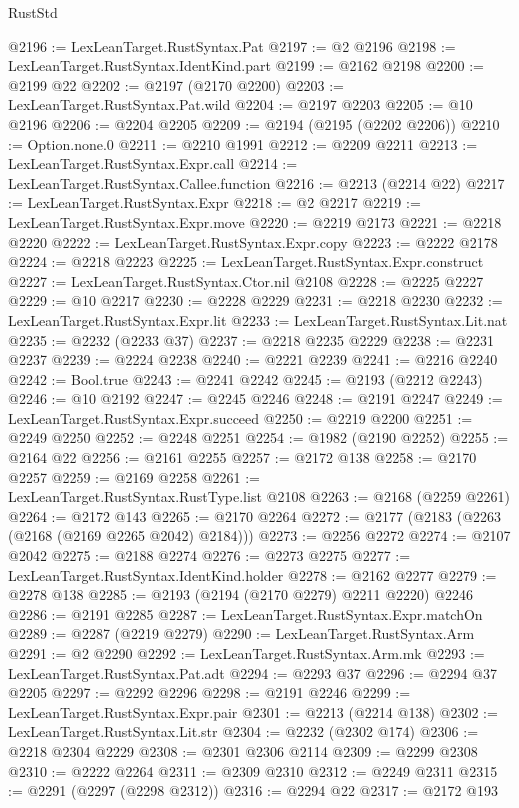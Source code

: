 \begin{lexlean}{RustStd}
\begin{coremodule}
@2196 := LexLeanTarget.RustSyntax.Pat
@2197 := @2 @2196
@2198 := LexLeanTarget.RustSyntax.IdentKind.part
@2199 := @2162 @2198
@2200 := @2199 @22
@2202 := @2197 (@2170 @2200)
@2203 := LexLeanTarget.RustSyntax.Pat.wild
@2204 := @2197 @2203
@2205 := @10 @2196
@2206 := @2204 @2205
@2209 := @2194 (@2195 (@2202 @2206))
@2210 := Option.none.{0}
@2211 := @2210 @1991
@2212 := @2209 @2211
@2213 := LexLeanTarget.RustSyntax.Expr.call
@2214 := LexLeanTarget.RustSyntax.Callee.function
@2216 := @2213 (@2214 @22)
@2217 := LexLeanTarget.RustSyntax.Expr
@2218 := @2 @2217
@2219 := LexLeanTarget.RustSyntax.Expr.move
@2220 := @2219 @2173
@2221 := @2218 @2220
@2222 := LexLeanTarget.RustSyntax.Expr.copy
@2223 := @2222 @2178
@2224 := @2218 @2223
@2225 := LexLeanTarget.RustSyntax.Expr.construct
@2227 := LexLeanTarget.RustSyntax.Ctor.nil @2108
@2228 := @2225 @2227
@2229 := @10 @2217
@2230 := @2228 @2229
@2231 := @2218 @2230
@2232 := LexLeanTarget.RustSyntax.Expr.lit
@2233 := LexLeanTarget.RustSyntax.Lit.nat
@2235 := @2232 (@2233 @37)
@2237 := @2218 @2235 @2229
@2238 := @2231 @2237
@2239 := @2224 @2238
@2240 := @2221 @2239
@2241 := @2216 @2240
@2242 := Bool.true
@2243 := @2241 @2242
@2245 := @2193 (@2212 @2243)
@2246 := @10 @2192
@2247 := @2245 @2246
@2248 := @2191 @2247
@2249 := LexLeanTarget.RustSyntax.Expr.succeed
@2250 := @2219 @2200
@2251 := @2249 @2250
@2252 := @2248 @2251
@2254 := @1982 (@2190 @2252)
@2255 := @2164 @22
@2256 := @2161 @2255
@2257 := @2172 @138
@2258 := @2170 @2257
@2259 := @2169 @2258
@2261 := LexLeanTarget.RustSyntax.RustType.list @2108
@2263 := @2168 (@2259 @2261)
@2264 := @2172 @143
@2265 := @2170 @2264
@2272 := @2177 (@2183 (@2263 (@2168 (@2169 @2265 @2042) @2184)))
@2273 := @2256 @2272
@2274 := @2107 @2042
@2275 := @2188 @2274
@2276 := @2273 @2275
@2277 := LexLeanTarget.RustSyntax.IdentKind.holder
@2278 := @2162 @2277
@2279 := @2278 @138
@2285 := @2193 (@2194 (@2170 @2279) @2211 @2220) @2246
@2286 := @2191 @2285
@2287 := LexLeanTarget.RustSyntax.Expr.matchOn
@2289 := @2287 (@2219 @2279)
@2290 := LexLeanTarget.RustSyntax.Arm
@2291 := @2 @2290
@2292 := LexLeanTarget.RustSyntax.Arm.mk
@2293 := LexLeanTarget.RustSyntax.Pat.adt
@2294 := @2293 @37
@2296 := @2294 @37 @2205
@2297 := @2292 @2296
@2298 := @2191 @2246
@2299 := LexLeanTarget.RustSyntax.Expr.pair
@2301 := @2213 (@2214 @138)
@2302 := LexLeanTarget.RustSyntax.Lit.str
@2304 := @2232 (@2302 @174)
@2306 := @2218 @2304 @2229
@2308 := @2301 @2306 @2114
@2309 := @2299 @2308
@2310 := @2222 @2264
@2311 := @2309 @2310
@2312 := @2249 @2311
@2315 := @2291 (@2297 (@2298 @2312))
@2316 := @2294 @22
@2317 := @2172 @193

\end{coremodule}
\end{lexlean}
